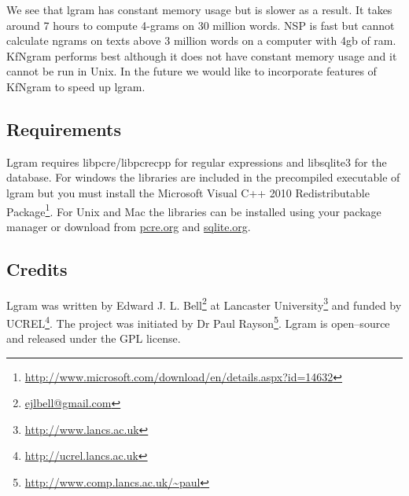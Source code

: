 \documentclass[12pt,a4paper]{report}
\begin{document}
We see that lgram has constant memory usage but is slower as a result. It takes around 7 hours to compute 4-grams on 30 million words. NSP is fast but cannot calculate ngrams on texts above 3 million words on a computer with 4gb of ram. KfNgram performs best although it does not have constant memory usage and it cannot be run in Unix. In the future we would like to incorporate features of KfNgram to speed up lgram.

\subsection*{Requirements}
Lgram requires libpcre/libpcrecpp for regular expressions and libsqlite3 for the database. For windows the libraries are included in the precompiled executable of lgram but you must install the Microsoft Visual C++ 2010 Redistributable Package\footnote{\url{http://www.microsoft.com/download/en/details.aspx?id=14632}}. For Unix and Mac the libraries can be installed using your package manager or download from \url{pcre.org} and \url{sqlite.org}.

\subsection*{Credits}
Lgram was written by Edward J. L. Bell\footnote{\url{ejlbell@gmail.com}} at Lancaster University\footnote{\url{http://www.lancs.ac.uk}} and funded by UCREL\footnote{\url{http://ucrel.lancs.ac.uk}}. The project was initiated by Dr Paul Rayson\footnote{\url{http://www.comp.lancs.ac.uk/~paul}}. Lgram is open--source and released under the GPL license.
\end{document}
